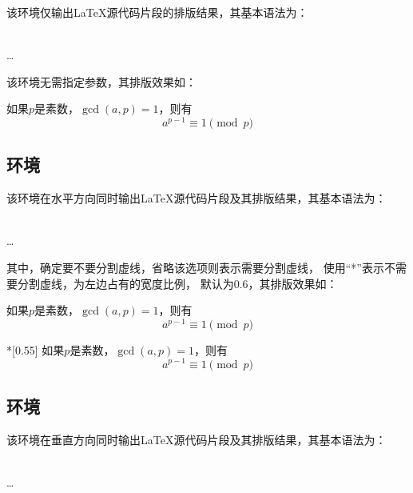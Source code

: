 \documentclass{ctexart}
\newcommand{\qtmark}[1]{``#1''}
\begin{document}
该环境仅输出\LaTeX 源代码片段的排版结果，其基本语法为：

\begin{command}
 \\
\ldots \\
\end{command}

该环境无需指定参数，其排版效果如：

\begin{outonly}
如果$p$是素数，$\gcd(a,p)=1$，则有
$$a^{p-1} \equiv 1 \pmod{p}$$
\end{outonly}

\subsection{环境}

该环境在水平方向同时输出\LaTeX 源代码片段及其排版结果，其基本语法为：

\begin{command}
 \\
\ldots \\
\end{command}

其中，确定要不要分割虚线，省略该选项则表示需要分割虚线，
使用\qtmark{*}表示不需要分割虚线，为左边占有的宽度比例，
默认为0.6，其排版效果如：

\begin{texdemoh}[0.7]
如果$p$是素数，$\gcd(a,p)=1$，则有
$$a^{p-1} \equiv 1 \pmod{p}$$
\end{texdemoh}

\begin{texdemoh}*[0.55]
如果$p$是素数，$\gcd(a,p)=1$，则有
$$a^{p-1} \equiv 1 \pmod{p}$$
\end{texdemoh}

\subsection{环境}

该环境在垂直方向同时输出\LaTeX 源代码片段及其排版结果，其基本语法为：

\begin{command}
 \\
\ldots \\
\end{command}
\end{document}
